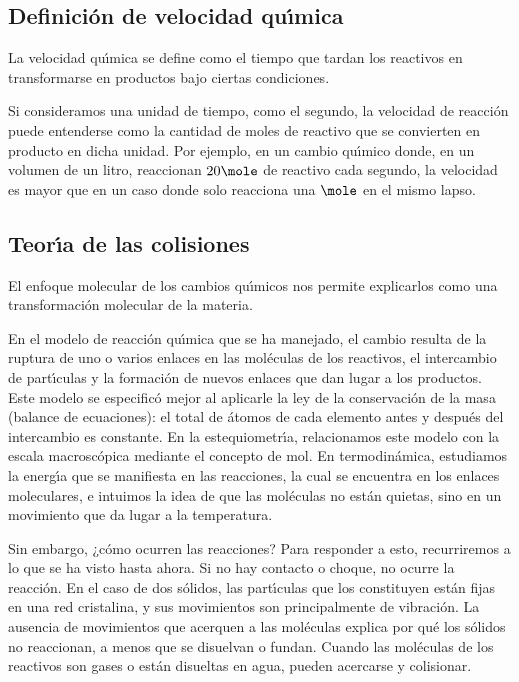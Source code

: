\subsection{Definici\'on de velocidad qu\'{\i}mica}
La velocidad qu\'{\i}mica se define como el tiempo que tardan los reactivos en transformarse en productos bajo ciertas condiciones.

Si consideramos una unidad de tiempo, como el segundo, la velocidad de reacci\'on puede entenderse como la cantidad de moles de reactivo que se convierten en producto en dicha unidad. Por ejemplo, en un cambio qu\'{\i}mico donde, en un volumen de un litro, reaccionan $20  \mole$ de reactivo cada segundo, la velocidad es mayor que en un caso donde solo reacciona una $\mole$ en el mismo lapso.

\subsection{Teor\'{\i}a de las colisiones}
El enfoque molecular de los cambios qu\'{\i}micos nos permite explicarlos como una transformaci\'on molecular de la materia.

En el modelo de reacci\'on qu\'{\i}mica que se ha manejado, el cambio resulta de la ruptura de uno o varios enlaces en las mol\'eculas de los reactivos, el intercambio de part\'{\i}culas y la formaci\'on de nuevos enlaces que dan lugar a los productos. Este modelo se especific\'o mejor al aplicarle la ley de la conservaci\'on de la masa (balance de ecuaciones): el total de \'atomos de cada elemento antes y despu\'es del intercambio es constante. En la estequiometr\'{\i}a, relacionamos este modelo con la escala macrosc\'opica mediante el concepto de mol. En termodin\'amica, estudiamos la energ\'{\i}a que se manifiesta en las reacciones, la cual se encuentra en los enlaces moleculares, e intuimos la idea de que las mol\'eculas no est\'an quietas, sino en un movimiento que da lugar a la temperatura.

Sin embargo, ¿c\'omo ocurren las reacciones? Para responder a esto, recurriremos a lo que se ha visto hasta ahora. Si no hay contacto o choque, no ocurre la reacci\'on. En el caso de dos s\'olidos, las part\'{\i}culas que los constituyen est\'an fijas en una red cristalina, y sus movimientos son principalmente de vibraci\'on. La ausencia de movimientos que acerquen a las mol\'eculas explica por qu\'e los s\'olidos no reaccionan, a menos que se disuelvan o fundan. Cuando las mol\'eculas de los reactivos son gases o est\'an disueltas en agua, pueden acercarse y colisionar.


